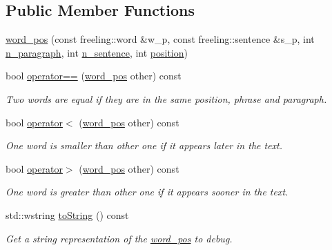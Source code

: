 \subsection*{Public Member Functions}
\begin{DoxyCompactItemize}
\item 
\hyperlink{structword__pos_a1fcd121634f7a9699cc602d73953cef3}{word\+\_\+pos} (const freeling\+::word \&w\+\_\+p, const freeling\+::sentence \&s\+\_\+p, int \hyperlink{structword__pos_a7c6cea15e21d79207980caf3a5b3a81e}{n\+\_\+paragraph}, int \hyperlink{structword__pos_a888700d9397364575480ec17eb0d91c7}{n\+\_\+sentence}, int \hyperlink{structword__pos_a5eaaede340f1d9ca3ac6819b977fd5a1}{position})
\item 
bool \hyperlink{structword__pos_af7b93610dbd7ad40e7e79245acc369b1}{operator==} (\hyperlink{structword__pos}{word\+\_\+pos} other) const 
\begin{DoxyCompactList}\small\item\em Two words are equal if they are in the same position, phrase and paragraph. \end{DoxyCompactList}\item 
bool \hyperlink{structword__pos_a2e03a153eee71b6c9179adf71fcf2f86}{operator$<$} (\hyperlink{structword__pos}{word\+\_\+pos} other) const 
\begin{DoxyCompactList}\small\item\em One word is smaller than other one if it appears later in the text. \end{DoxyCompactList}\item 
bool \hyperlink{structword__pos_abc4a513126b354f38b270026a28c601f}{operator$>$} (\hyperlink{structword__pos}{word\+\_\+pos} other) const 
\begin{DoxyCompactList}\small\item\em One word is greater than other one if it appears sooner in the text. \end{DoxyCompactList}\item 
std\+::wstring \hyperlink{structword__pos_a7027670964b84663d76819a3ff769b44}{to\+String} () const 
\begin{DoxyCompactList}\small\item\em Get a string representation of the \hyperlink{structword__pos}{word\+\_\+pos} to debug. \end{DoxyCompactList}\end{DoxyCompactItemize}
